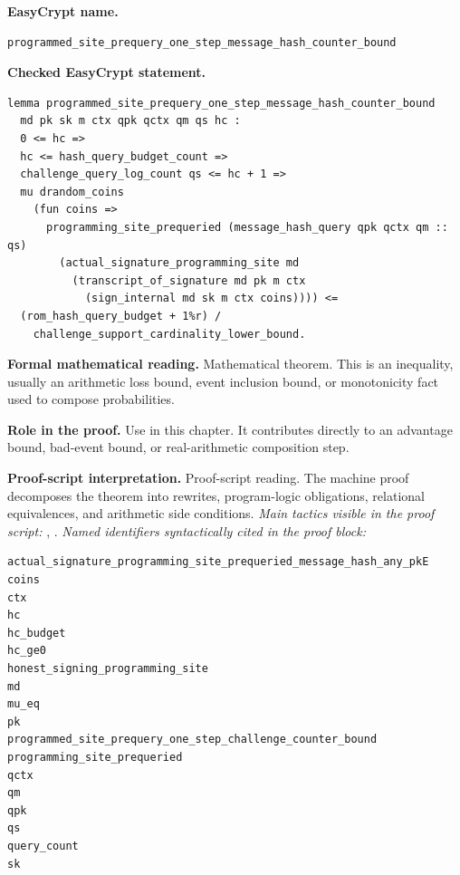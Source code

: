 \begin{formaltheorem}
\noindent\textbf{EasyCrypt name.}
\begin{lstlisting}[language=EasyCrypt,basicstyle=\ttfamily\scriptsize]
programmed_site_prequery_one_step_message_hash_counter_bound
\end{lstlisting}
\noindent\textbf{Checked EasyCrypt statement.}
\begin{lstlisting}[language=EasyCrypt,basicstyle=\ttfamily\scriptsize]
lemma programmed_site_prequery_one_step_message_hash_counter_bound
  md pk sk m ctx qpk qctx qm qs hc :
  0 <= hc =>
  hc <= hash_query_budget_count =>
  challenge_query_log_count qs <= hc + 1 =>
  mu drandom_coins
    (fun coins =>
      programming_site_prequeried (message_hash_query qpk qctx qm :: qs)
        (actual_signature_programming_site md
          (transcript_of_signature md pk m ctx
            (sign_internal md sk m ctx coins)))) <=
  (rom_hash_query_budget + 1%r) /
    challenge_support_cardinality_lower_bound.
\end{lstlisting}
\noindent\textbf{Formal mathematical reading.}
Mathematical theorem. This is an inequality, usually an arithmetic loss bound, event inclusion bound, or monotonicity fact used to compose probabilities.

\noindent\textbf{Role in the proof.}
Use in this chapter. It contributes directly to an advantage bound, bad-event bound, or real-arithmetic composition step.

\noindent\textbf{Proof-script interpretation.}
Proof-script reading. The machine proof decomposes the theorem into rewrites, program-logic obligations, relational equivalences, and arithmetic side conditions.
\emph{Main tactics visible in the proof script:} , .
\emph{Named identifiers syntactically cited in the proof block:}
\begin{lstlisting}[language=EasyCrypt,basicstyle=\ttfamily\scriptsize]
actual_signature_programming_site_prequeried_message_hash_any_pkE
coins
ctx
hc
hc_budget
hc_ge0
honest_signing_programming_site
md
mu_eq
pk
programmed_site_prequery_one_step_challenge_counter_bound
programming_site_prequeried
qctx
qm
qpk
qs
query_count
sk
\end{lstlisting}

\end{formaltheorem}

